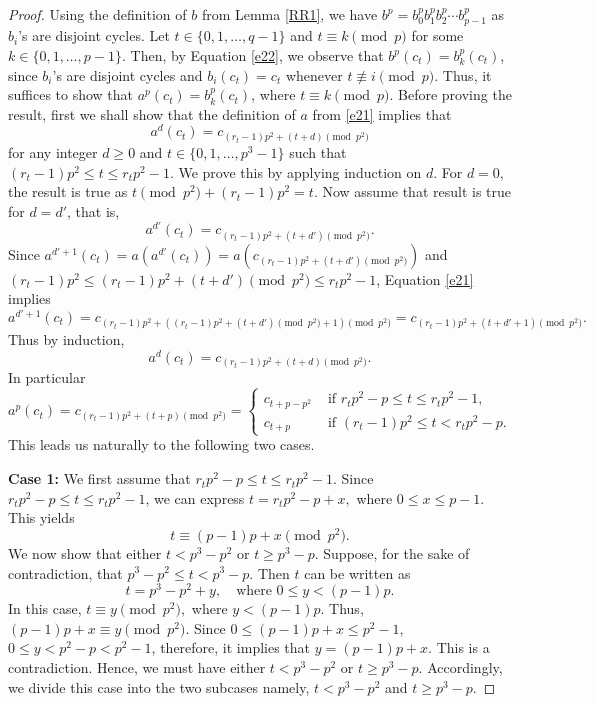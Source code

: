 \documentclass[11pt]{amsart}
\theoremstyle{plain}
\numberwithin{equation}{section}
\begin{document}
 \begin{proof}
  Using the definition of $b$ from Lemma \ref{RR1}, we have $b^p=b_{0}^pb_{1}^{p}b_2^{p}\cdots b_{p-1}^{p}$ as $b_i$'s are disjoint cycles. Let  $ t\in \{0,1,\ldots,q-1\}$ and $t \equiv k \pmod  p$ for some $k \in \{0,1,\ldots,p-1\}$.  Then, by Equation \eqref{e22}, we observe that $b^p(c_t)=b_k^p(c_t)$, since $b_i$'s are disjoint cycles and $b_i(c_t)=c_t$ whenever $t \not\equiv i \pmod  p$. Thus, it suffices to show that $a^p(c_t)=b_k^p(c_t)$, where $t \equiv k \pmod  p$. Before proving the result, first we shall show that the definition of $a$ from \eqref{e21} implies that
\[
a^{d}(c_t)=c_{(r_t-1)p^2+(t+d) \pmod {p^2}}
\]
for any integer $d \geq 0$ and $t \in \{0,1,\ldots,p^3-1\}$ such that $(r_t-1)p^2\leq t \leq r_tp^2-1$.
We prove this by applying induction on $d$. For $d=0$, the result is true as $t \pmod {p^2}+(r_t-1)p^2=t$. Now assume that result is true for $d=d'$, that is, 
\[
a^{d'}(c_t)=c_{(r_t-1)p^2+(t+d') \pmod {p^2}}.
\]
Since $a^{d'+1}(c_t)=a(a^{d'}(c_t))=a(c_{(r_t-1)p^2+(t+d') \pmod {p^2}})$ and $(r_t-1)p^2 \leq (r_t-1)p^2+(t+d') \pmod {p^2} \leq r_tp^2-1$,  Equation \eqref{e21} implies 
\[
a^{d'+1}(c_t)=c_{(r_t-1)p^2+((r_t-1)p^2+(t+d') \pmod {p^2}+1) \pmod {p^2}}=c_{(r_t-1)p^2+(t+d'+1)\pmod {p^2}}.
\]
Thus by induction,  
\begin{equation}\label{tempe4}
a^{d}(c_t)=c_{(r_t-1)p^2+(t+d) \pmod {p^2}}.
\end{equation}
In particular
\[
a^p(c_t)=c_{(r_t-1)p^2+(t+p)  \pmod {p^2}}=\begin{cases}

       
       c_{t+p-p^2} & \text{ if } r_tp^{2}-p \leq t \leq r_tp^{2}-1,
       \\
       c_{t+p} & \text{ if } (r_t-1)p^{2} \leq t < r_tp^{2}-p. 
       	\end{cases}
\]
This leads us naturally to the following two cases.

\textbf{Case 1:} 
We first assume that $r_t p^{2} - p \leq t \leq r_t p^{2} - 1$. Since $r_t p^{2} - p \leq t \leq r_t p^{2} - 1$, we can express $t = r_t p^{2} - p + x,$ where  $0 \leq x \leq p-1$.
This yields
\[
t \equiv (p-1)p + x \pmod {p^{2}}.
\]
We now show that either $t < p^{3} - p^{2}$ or $t \geq p^{3} - p$. Suppose, for the sake of contradiction, that $p^{3} - p^{2} \leq t < p^{3} - p$. 
Then $t$ can be written as 
\[
t = p^{3} - p^{2} + y, \quad \text{where } 0 \leq y < (p-1)p.
\]
In this case, $t \equiv y \pmod{p^{2}},
$
where $y < (p-1)p$. Thus, $(p-1)p + x \equiv y \pmod {p^2}$. Since $0 \leq (p-1)p + x \leq p^{2} - 1$, $0 \leq y <p^2-p<p^2-1$, therefore, it implies that $y= (p-1)p + x$. This is a contradiction. Hence, we must have either $t < p^{3} - p^{2}$ or $t \geq p^{3} - p$. 
Accordingly, we divide this case into the two subcases namely, $t < p^3-p^2$ and $t \geq p^3-p$.


\end{proof}
\end{document}
